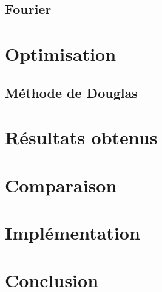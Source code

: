 \documentclass{article}
\begin{document}
\subsection{Fourier}

\section{Optimisation}
\subsection{Méthode de Douglas}

\section{Résultats obtenus}

\section{Comparaison}

\section{Implémentation}

\section{Conclusion}



\end{document}
